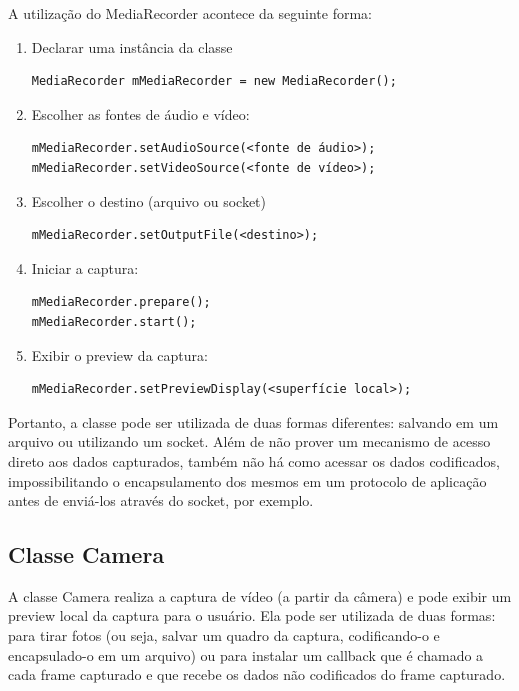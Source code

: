 \documentclass{acm_proc_article-sp}
\begin{document}
A utilização do MediaRecorder acontece da seguinte forma:
\begin{enumerate}
 \item Declarar uma instância da classe
  \begin{verbatim}
MediaRecorder mMediaRecorder = new MediaRecorder();
  \end{verbatim}
 \item Escolher as fontes de áudio e vídeo:
  \begin{verbatim}
mMediaRecorder.setAudioSource(<fonte de áudio>);
mMediaRecorder.setVideoSource(<fonte de vídeo>);
  \end{verbatim}
 \item Escolher o destino (arquivo ou socket)
  \begin{verbatim}
mMediaRecorder.setOutputFile(<destino>);
  \end{verbatim}
 \item Iniciar a captura:
  \begin{verbatim}
mMediaRecorder.prepare();
mMediaRecorder.start();
  \end{verbatim}
 \item Exibir o preview da captura:
  \begin{verbatim}
mMediaRecorder.setPreviewDisplay(<superfície local>);
  \end{verbatim}
\end{enumerate}

Portanto, a classe pode ser utilizada de duas formas diferentes: salvando em um arquivo ou utilizando um socket. Além de não prover um mecanismo de acesso direto aos dados capturados, também não há como acessar os dados codificados, impossibilitando o encapsulamento dos mesmos em um protocolo de aplicação antes de enviá-los através do socket, por exemplo. 

\subsection{Classe Camera}
A classe Camera realiza a captura de vídeo (a partir da câmera) e pode exibir um preview local da captura para o usuário. Ela pode ser utilizada de duas formas: para tirar fotos (ou seja, salvar um quadro da captura, codificando-o e encapsulado-o em um arquivo) ou para instalar um callback que é chamado a cada frame capturado e que recebe os dados não codificados do frame capturado.

\end{document}

